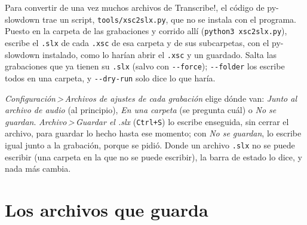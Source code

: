 \documentclass[12pt,
              article,
              oneside
              ]{memoir}
\newcommand*{\menu}[1]{\textit{#1}}
\newcommand*{\then}{\,>\,}
\newcommand*{\key}[1]{\texttt{#1}}
\begin{document}
Para convertir de una vez muchos archivos de Transcribe!, el código de
py-slowdown trae un script, \texttt{tools/xsc2slx.py}, que no se instala con
el programa. Puesto en la carpeta de las grabaciones y corrido allí
(\texttt{python3 xsc2slx.py}), escribe el \texttt{.slx} de cada
\texttt{.xsc} de esa carpeta y de sus subcarpetas, con el py-slowdown
instalado, como lo harían abrir el \texttt{.xsc} y un guardado.
Salta las grabaciones que ya tienen su \texttt{.slx} (salvo con
\texttt{-{}-force}); \texttt{-{}-folder} los escribe todos en una carpeta,
y \texttt{-{}-dry-run} solo dice lo que haría.

\menu{Configuración\then Archivos de ajustes de cada grabación} elige dónde
van: \menu{Junto al archivo de audio} (al principio), \menu{En una carpeta}
(se pregunta cuál) o \menu{No se guardan}. \menu{Archivo\then Guardar el
.slx} (\key{Ctrl+S}) lo escribe enseguida, sin cerrar el archivo, para
guardar lo hecho hasta ese momento; con \menu{No se guardan}, lo escribe
igual junto a la grabación, porque se pidió. Donde un archivo \texttt{.slx} no se puede
escribir (una carpeta en la que no se puede escribir), la barra de estado lo
dice, y nada más cambia.

\section{Los archivos que guarda}
\label{sec:archivos}
\end{document}
